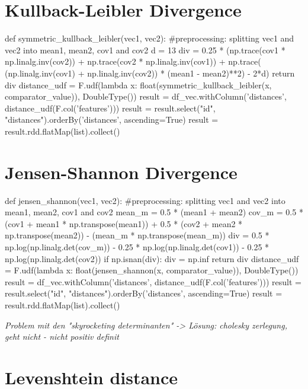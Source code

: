 \section{Kullback-Leibler Divergence}

\begin{pythonCode}
def symmetric_kullback_leibler(vec1, vec2):
	#preprocessing: splitting vec1 and vec2 into mean1, mean2, cov1 and cov2
    d = 13
    div = 0.25 * (np.trace(cov1 * np.linalg.inv(cov2)) + np.trace(cov2 * np.linalg.inv(cov1)) + np.trace( (np.linalg.inv(cov1) + np.linalg.inv(cov2)) * (mean1 - mean2)**2) - 2*d)
    return div
distance_udf = F.udf(lambda x: float(symmetric_kullback_leibler(x, comparator_value)), DoubleType())
result = df_vec.withColumn('distances', distance_udf(F.col('features')))
result = result.select("id", "distances").orderBy('distances', ascending=True)
result = result.rdd.flatMap(list).collect()
\end{pythonCode}


\section{Jensen-Shannon Divergence}

\begin{pythonCode}
def jensen_shannon(vec1, vec2):
	#preprocessing: splitting vec1 and vec2 into mean1, mean2, cov1 and cov2
    mean_m = 0.5 * (mean1 + mean2)
    cov_m = 0.5 * (cov1 + mean1 * np.transpose(mean1)) + 0.5 * (cov2 + mean2 * np.transpose(mean2)) - (mean_m * np.transpose(mean_m))
    div = 0.5 * np.log(np.linalg.det(cov_m)) - 0.25 * np.log(np.linalg.det(cov1)) - 0.25 * np.log(np.linalg.det(cov2))  
    if np.isnan(div):
        div = np.inf
    return div
distance_udf = F.udf(lambda x: float(jensen_shannon(x, comparator_value)), DoubleType())
result = df_vec.withColumn('distances', distance_udf(F.col('features')))
result = result.select("id", "distances").orderBy('distances', ascending=True)
result = result.rdd.flatMap(list).collect()

\end{pythonCode}

\textit{Problem mit den "skyrocketing determinanten" -> Lösung: cholesky zerlegung, geht nicht - nicht positiv definit}\cite[p.45]{schnitzer1}

\section{Levenshtein distance}

